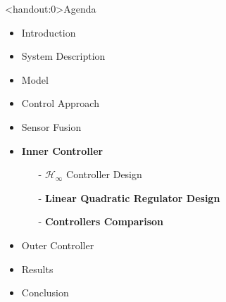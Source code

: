 
\begin{frame}<handout:0>{Agenda}{}
    \begin{itemize}
        \item Introduction
        \item System Description
        \item Model
        \item Control Approach
        \item Sensor Fusion
        \item \textcolor{aaublue}{\textbf{Inner Controller}}
        \begin{itemize}
            \item[-] $\mathcal{H}_\infty$ Controller Design
            \item[-] \textcolor{aaublue}{\textbf{Linear Quadratic Regulator Design}}
            \item[-] \textcolor{aaublue}{\textbf{Controllers Comparison}}
        \end{itemize}
        \item Outer Controller
        \item Results
        \item Conclusion
    \end{itemize}
\end{frame}